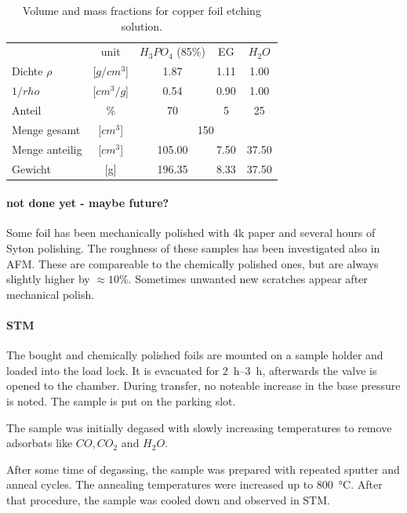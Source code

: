 \begin{table}
\centering
\caption{Volume and mass fractions for copper foil etching solution.}
\begin{tabular}{lcccc}
		&unit	&$H_3PO_4$ (85\%)&	EG	&	$H_2O$	\\
Dichte $\rho$   &[$g/cm^3$]	&	1.87	&	1.11	&	1.00	\\
$1/rho$		&[$cm^3/g$]	&	0.54	&	0.90	&	1.00	\\
Anteil 		& \%		&	70	&	5	&	25	\\ \hline
Menge gesamt    &[$cm^3$]	&		\multicolumn{3}{c}{150} 	\\
Menge anteilig  &[$cm^3$]	&	105.00	&	7.50	&	37.50	\\
Gewicht         &[g]		&	196.35	&	8.33	&	37.50	\\
\end{tabular}
\label{tab:used-etching-solution}
\end{table}

\paragraph{not done yet - maybe future?}
Some foil has been mechanically polished with 4k paper and several hours of Syton polishing. The roughness of these samples has been investigated also in AFM. These are compareable to the chemically polished ones, but are always slightly higher by $\approx 10\%$. Sometimes unwanted new scratches appear after mechanical polish.

\paragraph{STM}
The bought and chemically polished foils are mounted on a sample holder and loaded into the load lock. It is evacuated for \SIrange{2}{3}{\hour}, afterwards the valve is opened to the chamber. During transfer, no noteable increase in the base pressure is noted. The sample is put on the parking slot.

The sample was initially degased with slowly increasing temperatures to remove adsorbats like $CO, CO_2$ and $H_2O$.

After some time of degassing, the sample was prepared with repeated sputter and anneal cycles. The annealing temperatures were increased up to \SI{800}{\degreeCelsius}. 
After that procedure, the sample was cooled down and observed in STM.

